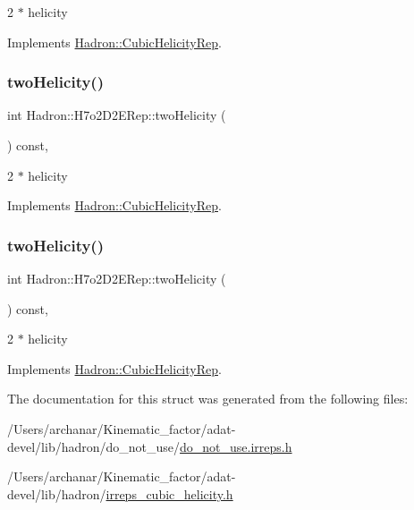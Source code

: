 2 $\ast$ helicity 

Implements \mbox{\hyperlink{structHadron_1_1CubicHelicityRep_af507aa56fc2747eacc8cb6c96db31ecc}{Hadron\+::\+Cubic\+Helicity\+Rep}}.

\mbox{\label{structHadron_1_1H7o2D2ERep_ab74ff7de742966a259984e56abc8dc12}} 
\subsubsection{\texorpdfstring{twoHelicity()}{twoHelicity()}\hspace{0.1cm}{\footnotesize\ttfamily [2/3]}}
{\footnotesize\ttfamily int Hadron\+::\+H7o2\+D2\+E\+Rep\+::two\+Helicity (\begin{DoxyParamCaption}{ }\end{DoxyParamCaption}) const\hspace{0.3cm}{\ttfamily [inline]}, {\ttfamily [virtual]}}

2 $\ast$ helicity 

Implements \mbox{\hyperlink{structHadron_1_1CubicHelicityRep_af507aa56fc2747eacc8cb6c96db31ecc}{Hadron\+::\+Cubic\+Helicity\+Rep}}.

\mbox{\label{structHadron_1_1H7o2D2ERep_ab74ff7de742966a259984e56abc8dc12}} 
\subsubsection{\texorpdfstring{twoHelicity()}{twoHelicity()}\hspace{0.1cm}{\footnotesize\ttfamily [3/3]}}
{\footnotesize\ttfamily int Hadron\+::\+H7o2\+D2\+E\+Rep\+::two\+Helicity (\begin{DoxyParamCaption}{ }\end{DoxyParamCaption}) const\hspace{0.3cm}{\ttfamily [inline]}, {\ttfamily [virtual]}}

2 $\ast$ helicity 

Implements \mbox{\hyperlink{structHadron_1_1CubicHelicityRep_af507aa56fc2747eacc8cb6c96db31ecc}{Hadron\+::\+Cubic\+Helicity\+Rep}}.



The documentation for this struct was generated from the following files\+:\begin{DoxyCompactItemize}
\item 
/\+Users/archanar/\+Kinematic\+\_\+factor/adat-\/devel/lib/hadron/do\+\_\+not\+\_\+use/\mbox{\hyperlink{adat-devel_2lib_2hadron_2do__not__use_2do__not__use_8irreps_8h}{do\+\_\+not\+\_\+use.\+irreps.\+h}}\item 
/\+Users/archanar/\+Kinematic\+\_\+factor/adat-\/devel/lib/hadron/\mbox{\hyperlink{adat-devel_2lib_2hadron_2irreps__cubic__helicity_8h}{irreps\+\_\+cubic\+\_\+helicity.\+h}}\end{DoxyCompactItemize}
